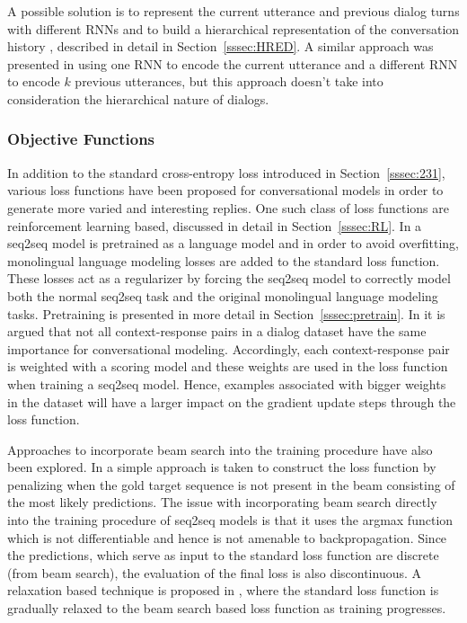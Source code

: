\documentclass[12pt]{article}
\begin{document}
A possible solution is to represent the current utterance and previous dialog turns with different RNNs and to build a hierarchical representation of the conversation history \cite{Serban:2015}, described in detail in Section~\ref{sssec:HRED}. A similar approach was presented in \cite{Zhaob:2017} using one RNN to encode the current utterance and a different RNN to encode \(k\) previous utterances, but this approach doesn't take into consideration the hierarchical nature of dialogs.
 

\subsubsection{Objective Functions} \label{sssec:functions}
In addition to the standard cross-entropy loss introduced in Section~\ref{sssec:231}, various loss functions have been proposed for conversational models in order to generate more varied and interesting replies. One such class of loss functions are reinforcement learning based, discussed in detail in Section~\ref{sssec:RL}. In \cite{Ramachandran:2016} a seq2seq model is pretrained as a language model and in order to avoid overfitting, monolingual language modeling losses are added to the standard loss function. These losses act as a regularizer by forcing the seq2seq model to correctly model both the normal seq2seq task and the original monolingual language modeling tasks. Pretraining is presented in more detail in Section~\ref{sssec:pretrain}. In \cite{Lison:2017} it is argued that not all context-response pairs in a dialog dataset have the same importance for conversational modeling. Accordingly, each context-response pair is weighted with a scoring model and these weights are used in the loss function when training a seq2seq model. Hence, examples associated with bigger weights in the dataset will have a larger impact on the gradient update steps through the loss function. 

Approaches to incorporate beam search into the training procedure have also been explored. In \cite{Wiseman:2016} a simple approach is taken to construct the loss function by penalizing when the gold target sequence is not present in the beam consisting of the most likely predictions. The issue with incorporating beam search directly into the training procedure of seq2seq models is that it uses the argmax function which is not differentiable and hence is not amenable to backpropagation. Since the predictions, which serve as input to the standard loss function are discrete (from beam search), the evaluation of the final loss is also discontinuous. A relaxation based technique is proposed in \cite{Goyal:2017}, where the standard loss function is gradually relaxed to the beam search based loss function as training progresses.
\end{document}
